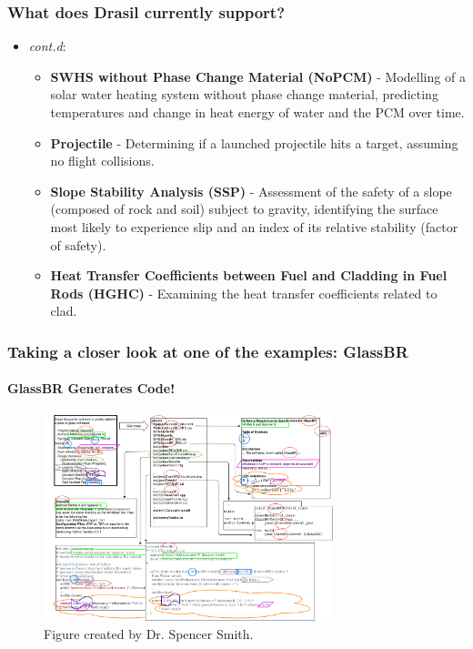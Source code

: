 \documentclass{beamer}
\begin{document}
\begin{frame}
    \frametitle{What does Drasil currently support?}
    \begin{itemize}
        \item<1-> \emph{cont.d}:
            \begin{itemize}
                \item<1-> \textbf{SWHS without Phase Change Material (NoPCM)} - Modelling of a solar water heating system without phase change material, predicting temperatures and change in heat energy of water and the PCM over time.
                \item<2-> \textbf{Projectile} - Determining if a launched projectile hits a target, assuming no flight collisions.
                \item<3-> \textbf{Slope Stability Analysis (SSP)} - Assessment of the safety of a slope (composed of rock and soil) subject to gravity, identifying the surface most likely to experience slip and an index of its relative stability (factor of safety).
                \item<4-> \textbf{Heat Transfer Coefficients between Fuel and Cladding in Fuel Rods (HGHC)} - Examining the heat transfer coefficients related to clad.
            \end{itemize}
    \end{itemize}
\end{frame}

\begin{frame}
    \frametitle{Taking a closer look at one of the examples: GlassBR}
    \framesubtitle{GlassBR Generates Code!}
    \begin{figure}
        \center
        \includegraphics[width=0.75\textwidth]{assets/DrasilSupportsChange.png}
        \caption{Figure created by Dr. Spencer Smith.}
        \label{fig:glassbr}
    \end{figure}
\end{frame}
\end{document}
